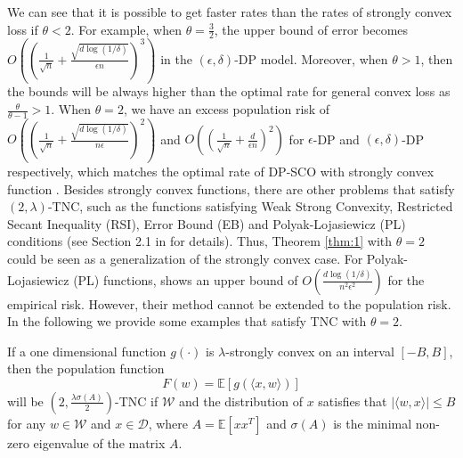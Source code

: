\documentclass[12pt]{alt2022} %
\begin{document}
\begin{remark}\label{remark:3}
    We can see that it is possible to get faster rates than the rates of strongly convex loss if $\theta<2$. For example, when $\theta=\frac{3}{2}$, the upper bound of error becomes  $O((\frac{1}{\sqrt{n}}+\frac{\sqrt{d\log(1/\delta)}}{\epsilon n})^3)$ in the $(\epsilon, \delta)$-DP model. Moreover, when $\theta>1$, then the bounds will be always higher than the optimal rate for general convex loss as $\frac{\theta}{\theta-1}>1$. When $\theta=2$, we have an excess population risk of $O((\frac{1}{\sqrt{n}}+\frac{\sqrt{d\log ({1}/{\delta})}}{n\epsilon})^{2})$ and $O((\frac{1}{\sqrt{n}}+\frac{d}{\epsilon n})^2)$ for $\epsilon$-DP and $(\epsilon, \delta)$-DP respectively, which matches the optimal rate of DP-SCO with strongly convex function \citep{feldman2020private}. Besides strongly convex  functions, there are other problems that satisfy $(2, \lambda)$-TNC, such as the functions satisfying Weak Strong Convexity, Restricted Secant Inequality (RSI), Error Bound (EB) and Polyak-{L}ojasiewicz (PL) conditions (see Section 2.1 in \citep{karimi2016linear} for details). Thus, Theorem \ref{thm:1} with $\theta=2$ could be seen as a generalization of the strongly convex case. For Polyak- {L}ojasiewicz (PL) functions, \citep{wang2018differentially} shows an upper bound of $O(\frac{d\log(1/\delta)}{n^2\epsilon^2})$ for the empirical risk. However, their method cannot be extended to the population risk. In the following  we provide some examples that satisfy TNC with $\theta=2$. 
\end{remark}
\iffalse
\begin{theorem}\label{thm:2}
     If a one dimensional function $g(\cdot)$ is $\lambda$-strongly convex on an interval $[-B, B]$, then the population function 
\begin{equation}
    F(w)=\mathbb{E}[g(\langle x, w\rangle)] 
\end{equation}
will be $(2, \frac{\lambda \sigma(A)}{2})$-TNC if $\mathcal{W}$ and the distribution of $x$ satisfies that $|\langle w, x \rangle|\leq B$ for any $w\in \mathcal{W}$ and $x\in \mathcal{D}$, where $A=\mathbb{E}[xx^T]$ and $\sigma(A)$ is the minimal non-zero eigenvalue of the matrix $A$. 
\end{theorem}
\end{document}
